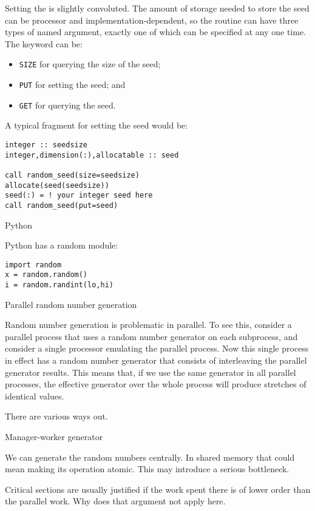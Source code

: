 Setting the  is slightly convoluted. The
amount of storage needed to store the seed can be processor and
implementation-dependent, so the routine 
can have three types of named argument, exactly one of which can be
specified at any one time. The keyword can be:
\begin{itemize}
\item \lstinline{SIZE} for querying the size of the seed;
\item \lstinline{PUT} for setting the seed; and
\item \lstinline{GET} for querying the seed.
\end{itemize}
A typical fragment for setting the seed would be:
\begin{lstlisting}
integer :: seedsize
integer,dimension(:),allocatable :: seed

call random_seed(size=seedsize)
allocate(seed(seedsize))
seed(:) = ! your integer seed here
call random_seed(put=seed)
\end{lstlisting}


 {Python}
\lstset{language=Python}

Python has a random module:
\lstset{language=Python}
\begin{lstlisting}
import random
x = random.random()
i = random.randint(lo,hi)
\end{lstlisting}
\lstset{language=C}

 {Parallel random number generation}
\label{sec:parallel-random}

Random number generation is problematic in parallel. To see this,
consider a parallel process that uses a random number generator on
each subprocess, and
consider a single processor emulating the parallel process. Now this
single process in effect has a random number generator that consists
of interleaving the parallel generator results. This means that, if we
use the same generator in all parallel processes, the effective
generator over the whole process will produce stretches of identical
values.

There are various ways out.

 {Manager-worker generator}

We can generate the random numbers centrally. In shared memory that could mean
making its operation atomic. This may introduce a serious bottleneck.
\begin{exercise}
  Critical sections are usually justified if the work spent there is of lower order
  than the parallel work. Why does that argument not apply here.
\end{exercise}

